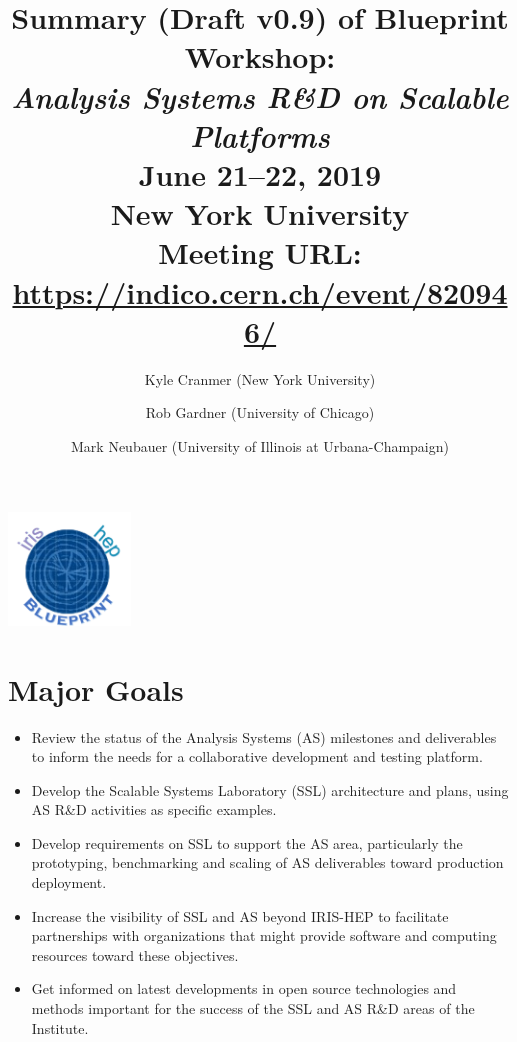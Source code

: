 \documentclass[11pt,letterpaper,fleqn]{article}
\date{} %
\title{\large Summary (Draft v0.9) of Blueprint Workshop: \\
\vspace{1pt}
\LARGE \textit{Analysis Systems R\&D on Scalable Platforms} \\
\color{black} \normalsize
\vspace{10pt}
June 21--22, 2019 \\
New York University \\
Meeting URL: \href{https://indico.cern.ch/event/820946/}{https://indico.cern.ch/event/820946/}
} %
\author{Kyle Cranmer {\normalfont(New York University)}
      \and  Rob Gardner {\normalfont(University of Chicago)}
      \and  Mark Neubauer {\normalfont(University of Illinois at Urbana-Champaign)}
      }
\begin{document}
\maketitle %
\normalfont

\thispagestyle{firststyle}

\vspace{-250pt}
\hspace{360pt}
\includegraphics[height=30mm]{../../../figures/iris-hep-bluprint-logo.png}

\vspace{120pt}
\section*{Major Goals}
\vspace{3pt}
\begin{itemize}
  \item Review the status of the Analysis Systems (AS) milestones and deliverables to inform the needs for a collaborative development and testing platform.
  \item Develop the Scalable Systems Laboratory (SSL) architecture and plans, using AS R\&D activities as specific examples.
  \item Develop requirements on SSL to support the AS area, particularly the prototyping, benchmarking and scaling of AS deliverables toward production deployment.
  \item Increase the visibility of SSL and AS beyond IRIS-HEP to facilitate partnerships with organizations that might provide software and computing resources toward these objectives.
  \item Get informed on latest developments in open source technologies and methods important for the success of the SSL and AS R\&D areas of the Institute.
\end{itemize}
\end{document}

